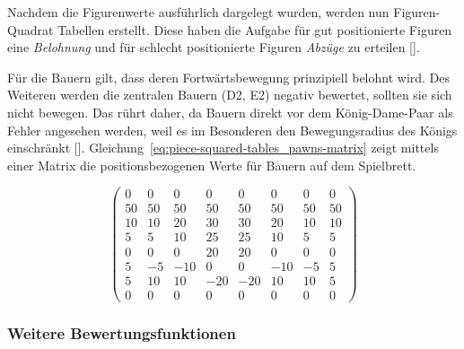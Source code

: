 Nachdem die Figurenwerte ausführlich dargelegt wurden, werden nun Figuren-Quadrat Tabellen erstellt.
Diese haben die Aufgabe für gut positionierte Figuren eine \textit{Belohnung} und für schlecht positionierte Figuren \textit{Abzüge} zu erteilen [\cite{Wiki2018}].

Für die Bauern gilt, dass deren Fortwärtsbewegung prinzipiell belohnt wird.
Des Weiteren werden die zentralen Bauern (D2, E2) negativ bewertet, sollten sie sich nicht bewegen.
Das rührt daher, da Bauern direkt vor dem König-Dame-Paar als Fehler angesehen werden, weil es im Besonderen den Bewegungsradius des Königs einschränkt [\cite{Wiki2018}].
Gleichung~\ref{eq:piece-squared-tables_pawns-matrix} zeigt mittels einer Matrix die positionsbezogenen Werte für Bauern auf dem Spielbrett.

\begin{equation} \label{eq:piece-squared-tables_pawns-matrix}
\begin{pmatrix}
0 & 0 & 0 & 0 & 0 & 0 & 0 & 0 \\
50 & 50 & 50 & 50 & 50 & 50 & 50 & 50 \\
10 & 10 & 20 & 30 & 30 & 20 & 10 & 10 \\
5 & 5 & 10 & 25 & 25 & 10 & 5 & 5 \\
0 & 0 & 0 & 20 & 20 & 0 & 0 & 0 \\
5 & -5 & -10 & 0 & 0 & -10 & -5 & 5 \\
5 & 10 & 10 & -20 & -20 & 10 & 10 & 5 \\
0 & 0 & 0 & 0 & 0 & 0 & 0 & 0
\end{pmatrix}
\end{equation}


\subsubsection{Weitere Bewertungsfunktionen}

